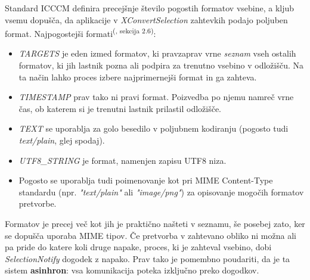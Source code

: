 \documentclass[12pt, A4]{article}
\begin{document}
	
	Standard ICCCM definira precejšnje število pogostih formatov vsebine, a kljub vsemu dopušča, da aplikacije v \textit{XConvertSelection} zahtevkih podajo poljuben format.
	Najpogostejši formati\textsuperscript{(\cite{icccm}, sekcija 2.6)}:
	\begin{itemize}
		\item \textit{TARGETS} je eden izmed formatov, ki pravzaprav vrne \textit{seznam} vseh ostalih formatov, ki jih lastnik pozna ali podpira za trenutno vsebino v odložišču. Na ta način lahko proces izbere najprimernejši format in ga zahteva.
		\item \textit{TIMESTAMP} prav tako ni pravi format. Poizvedba po njemu namreč vrne čas, ob katerem si je trenutni lastnik prilastil odložišče.
		
		\item \textit{TEXT} se uporablja za golo besedilo v poljubnem kodiranju (pogosto tudi \textit{text/plain}, glej spodaj).
		\item \textit{UTF8\_STRING} je format, namenjen zapisu UTF8 niza.
		\item Pogosto se uporablja tudi poimenovanje kot pri MIME Content-Type standardu (npr. \textit{"text/plain"} ali \textit{"image/png"}) za opisovanje mogočih formatov pretvorbe.
	\end{itemize}
	
	\pagebreak
	Formatov je precej več kot jih je praktično našteti v seznamu, še posebej zato, ker se dopušča uporaba MIME tipov. Če pretvorba v zahtevano obliko ni možna ali pa pride do katere koli druge napake, proces, ki je zahteval vsebino, dobi \textit{SelectionNotify} dogodek z napako. Prav tako je pomembno poudariti, da je ta sistem \textbf{asinhron}: vsa komunikacija poteka izključno preko dogodkov.
	
\end{document}

